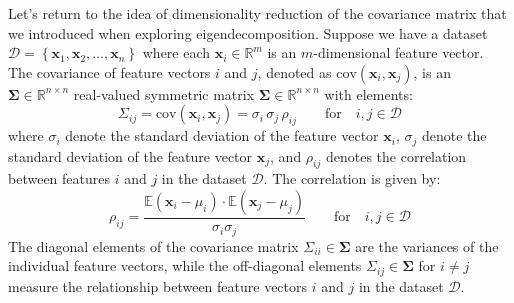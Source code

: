\documentclass{article}[11pt]
\def\R{\mathbb{R}}
\def\D{\mathcal{D}}
\begin{document}
Let's return to the idea of dimensionality reduction of the covariance matrix that we introduced when exploring eigendecomposition.
Suppose we have a dataset $\D = \left\{\mathbf{x}_{1},\mathbf{x}_{2},\dots,\mathbf{x}_{n}\right\}$ where each $\mathbf{x}_{i}\in\mathbb{R}^{m}$ is an $m$-dimensional feature vector.
The covariance of feature vectors $i$ and $j$, denoted as $\text{cov}\left(\mathbf{x}_{i},\mathbf{x}_{j}\right)$, is an $\mathbf{\Sigma}\in\mathbb{R}^{n\times{n}}$ 
real-valued symmetric matrix $\mathbf{\Sigma}\in\R^{n\times{n}}$ with elements: 
\begin{equation}
    \Sigma_{ij} = \text{cov}\left(\mathbf{x}_{i},\mathbf{x}_{j}\right) = \sigma_{i}\,\sigma_{j}\,\rho_{ij}\qquad\text{for}\quad{i,j \in \mathcal{D}}
\end{equation}
where $\sigma_{i}$ denote the standard deviation of the feature vector $\mathbf{x}_{i}$, $\sigma_{j}$ denote the standard deviation of the 
feature vector $\mathbf{x}_{j}$, and $\rho_{ij}$ denotes the correlation between features $i$ and $j$ in the dataset $\D$. The correlation is given by:
\begin{equation}
\rho_{ij} = \frac{\mathbb{E}(\mathbf{x}_{i}-\mu_{i})\cdot\mathbb{E}(\mathbf{x}_{j} - \mu_{j})}{\sigma_{i}\sigma_{j}}\qquad\text{for}\quad{i,j \in \mathcal{D}}
\end{equation}
The diagonal elements of the covariance matrix $\Sigma_{ii}\in\mathbf{\Sigma}$ are the variances of the individual feature vectors,
while the off-diagonal elements $\Sigma_{ij}\in\mathbf{\Sigma}$ for $i\neq{j}$ measure the relationship between feature vectors $i$ and $j$
in the dataset $\mathcal{D}$. 
\end{document}
